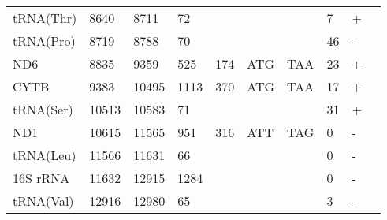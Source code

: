\documentclass[../DISSERTACAO_MAIN.tex]{subfiles}
\begin{document}
\begin{longtable}{llllllllllllllllllllll}
			tRNA(Thr)    & 8640           & \multicolumn{2}{l}{8711}  & \multicolumn{2}{l}{72}         & \multicolumn{2}{l}{}          & \multicolumn{3}{l}{}                    & \multicolumn{3}{l}{}      & \multicolumn{3}{l}{7}          & \multicolumn{3}{l}{+}      & \multicolumn{2}{l}{} \\
			tRNA(Pro)    & 8719           & \multicolumn{2}{l}{8788}  & \multicolumn{2}{l}{70}         & \multicolumn{2}{l}{}          & \multicolumn{3}{l}{}                    & \multicolumn{3}{l}{}      & \multicolumn{3}{l}{46}         & \multicolumn{3}{l}{-}      & \multicolumn{2}{l}{} \\
			ND6          & 8835           & \multicolumn{2}{l}{9359}  & \multicolumn{2}{l}{525}        & \multicolumn{2}{l}{174}       & \multicolumn{3}{l}{ATG}                 & \multicolumn{3}{l}{TAA}   & \multicolumn{3}{l}{23}         & \multicolumn{3}{l}{+}      & \multicolumn{2}{l}{} \\
			CYTB         & 9383           & \multicolumn{2}{l}{10495} & \multicolumn{2}{l}{1113}       & \multicolumn{2}{l}{370}       & \multicolumn{3}{l}{ATG}                 & \multicolumn{3}{l}{TAA}   & \multicolumn{3}{l}{17}         & \multicolumn{3}{l}{+}      & \multicolumn{2}{l}{} \\
			tRNA(Ser)    & 10513          & \multicolumn{2}{l}{10583} & \multicolumn{2}{l}{71}         & \multicolumn{2}{l}{}          & \multicolumn{3}{l}{}                    & \multicolumn{3}{l}{}      & \multicolumn{3}{l}{31}         & \multicolumn{3}{l}{+}      & \multicolumn{2}{l}{} \\
			ND1          & 10615          & \multicolumn{2}{l}{11565} & \multicolumn{2}{l}{951}        & \multicolumn{2}{l}{316}       & \multicolumn{3}{l}{ATT}                 & \multicolumn{3}{l}{TAG}   & \multicolumn{3}{l}{0}          & \multicolumn{3}{l}{-}      & \multicolumn{2}{l}{} \\
			tRNA(Leu)    & 11566          & \multicolumn{2}{l}{11631} & \multicolumn{2}{l}{66}         & \multicolumn{2}{l}{}          & \multicolumn{3}{l}{}                    & \multicolumn{3}{l}{}      & \multicolumn{3}{l}{0}          & \multicolumn{3}{l}{-}      & \multicolumn{2}{l}{} \\
			16S 				rRNA & 11632          & \multicolumn{2}{l}{12915} & \multicolumn{2}{l}{1284}       & \multicolumn{2}{l}{}          & \multicolumn{3}{l}{}                    & \multicolumn{3}{l}{}      & \multicolumn{3}{l}{0}          & \multicolumn{3}{l}{-}      & \multicolumn{2}{l}{} \\
			tRNA(Val)    & 12916          & \multicolumn{2}{l}{12980} & \multicolumn{2}{l}{65}         & \multicolumn{2}{l}{}          & \multicolumn{3}{l}{}                    & \multicolumn{3}{l}{}      & \multicolumn{3}{l}{3}          & \multicolumn{3}{l}{-}      & \multicolumn{2}{l}{} \\

\end{longtable}
\end{document}
